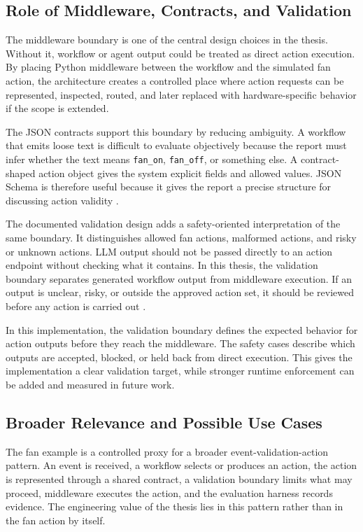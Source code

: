 \subsection{Role of Middleware, Contracts, and Validation}\label{subsec:discussion-middleware-contracts-validation}

The middleware boundary is one of the central design choices in the thesis. Without it, workflow or agent output could be treated as direct action execution. By placing Python middleware between the workflow and the simulated fan action, the architecture creates a controlled place where action requests can be represented, inspected, routed, and later replaced with hardware-specific behavior if the scope is extended.

The JSON contracts support this boundary by reducing ambiguity. A workflow that emits loose text is difficult to evaluate objectively because the report must infer whether the text means \texttt{fan\_on}, \texttt{fan\_off}, or something else. A contract-shaped action object gives the system explicit fields and allowed values. JSON Schema is therefore useful because it gives the report a precise structure for discussing action validity \cite{jsonSchemaDocs}.

The documented validation design adds a safety-oriented interpretation of the same boundary. It distinguishes allowed fan actions, malformed actions, and risky or unknown actions.
LLM output should not be passed directly to an action endpoint without checking what it contains. In this thesis, the validation boundary separates generated workflow output from middleware execution. If an output is unclear, risky, or outside the approved action set, it should be reviewed before any action is carried out \cite{humanInTheLoopAmershi2014}.


In this implementation, the validation boundary defines the expected behavior for action outputs before they reach the middleware. The safety cases describe which outputs are accepted, blocked, or held back from direct execution. This gives the implementation a clear validation target, while stronger runtime enforcement can be added and measured in future work.

\subsection{Broader Relevance and Possible Use Cases}\label{subsec:discussion-broader-relevance}

The fan example is a controlled proxy for a broader event-validation-action pattern. An event is received, a workflow selects or produces an action, the action is represented through a shared contract, a validation boundary limits what may proceed, middleware executes the action, and the evaluation harness records evidence. The engineering value of the thesis lies in this pattern rather than in the fan action by itself.

